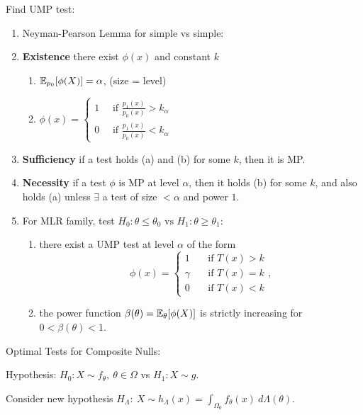 Find UMP test: \begin{enumerate}[
        leftmargin = 2em,
    ]
    \item Neyman-Pearson Lemma for simple vs simple: 
    \item [] \textbf{Existence} there exist $\phi(x)$ and constant $k$ \begin{enumerate}
        \item $\mathbb{E}_{p_0}[\phi(X)] = \alpha$, (size = level)
        \item $\phi(x) = \begin{cases} 
            1 \quad \text{ if }  \frac{p_1(x)}{p_0(x)} > k_\alpha \\[1ex] 
            0 \quad \text{ if }  \frac{p_1(x)}{p_0(x)} < k_\alpha 
        \end{cases}$
    \end{enumerate}
    \item [] \textbf{Sufficiency} if a test holds (a) and (b) for some $k$, then it is MP.
    \item [] \textbf{Necessity} if a test $\phi$ is MP at level $\alpha$, then it holds (b) for some $k$, and also holds (a) unless $\exists$ a test of size $< \alpha$ and power $1$.
    \item For MLR family, test $H_0: \theta \leq \theta_0 \text{ vs } H_1: \theta \geq \theta_1$: \begin{enumerate}
        \item there exist a UMP test at level $\alpha$ of the form$$
            \phi(x) = \begin{cases}
                1  & \quad \text{if } T(x) > k\\
                \gamma & \quad \text{if } T(x) = k\\
                0 & \quad \text{if } T(x) < k
            \end{cases},
        $$
        \item the power function $\beta(\theta) = \mathbb{E}_\theta[\phi(X)]$ is strictly increasing for $0 < \beta(\theta) < 1$.
    \end{enumerate}
\end{enumerate}



Optimal Tests for Composite Nulls:

Hypothesis: $H_0: X \sim f_\theta,\ \theta \in \Omega$ vs $H_1: X \sim g$.

Consider new hypothesis $
    H_\Lambda:\ X\sim h_\Lambda(x) = \int_{\Omega_0}f_\theta(x)\ d\Lambda(\theta).
$

